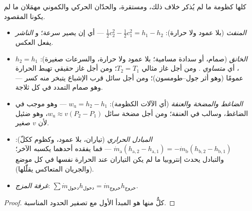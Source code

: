 \begin{proposition}\label{prop:b2:open-systems:devices}
كلها كظومة ما لم يُذكر خلاف ذلك، ومستقرة، والحدّان الحركي والكموني
مهمَلان ما لم يكونا المقصود.
\begin{itemize}
\item \emph{المنفث} (بلا عمود ولا حرارة): $\tfrac12c_2^2 -
      \tfrac12c_1^2 = h_1 - h_2$ --- أي إن  يصير سرعة؛ و
      \emph{الناشر} يفعل العكس.
\item \emph{الخانق} (صمام، أو سدادة مسامية؛ بلا عمود
      ولا حرارة، والسرعات صغيرة): $h_2 = h_1$، أي \emph{متساوي }. ومن أجل
      غاز مثالي $T_2 = T_1$؛ ومن أجل غاز حقيقي تهبط الحرارة
      عمومًا (وهو أثر جول--طومسون)؛ ومن أجل سائل قرب الإشباع
      يتبخر منه كسر --- وهو صمام التمدد في كل ثلاجة.
\item \emph{الضاغط والمضخة والعنفة} (أي الآلات
      الكظومة): $w_{\text{u}} = h_2 - h_1$ --- وهو موجب في الضاغط،
      وسالب في العنفة؛ ومن أجل مضخة سائل $w_{\text{u}} \approx
      v(P_2 - P_1)$، وهو ضئيل لأن $v$ صغير.
\item \emph{المبادل الحراري} (تياران، بلا
      عمود، وكظوم ككلّ): $\dot m_{\text{a}}(h_{\text{a},2} -
      h_{\text{a},1}) = -\dot m_{\text{b}}(h_{\text{b},2} - h_{\text{b},1})$
      --- فما يفقده أحدهما يكسبه الآخر؛ والتبادل يحدث إنتروبيا
      ما لم يكن التياران عند الحرارة نفسها في كل موضع
      (والجريان المتعاكس يقلّلها).
\item \emph{غرفة المزج}: $\sum\dot m_{\text{دخول}}h_{\text{دخول}} = \dot
      m_{\text{خروج}}h_{\text{خروج}}$.
\end{itemize}
\end{proposition}

\begin{proof}
كلٌّ منها هو المبدأ الأول مع تصفير الحدود المناسبة.
\end{proof}

